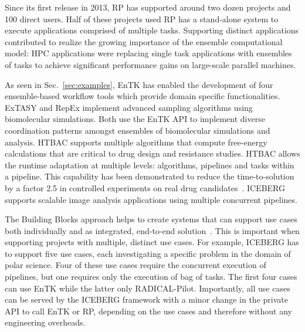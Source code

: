 \documentclass[preprint,12pt, a4paper]{elsarticle}
\begin{document}
Since its first release in 2013, RP has supported around two dozen projects
and 100 direct users. Half of these projects used RP has a stand-alone system
to execute applications comprised of multiple tasks. Supporting distinct
applications contributed to realize the growing importance of the
ensemble computational model: HPC applications were replacing single task
applications with ensembles of tasks to achieve significant performance gains
on large-scale parallel machines.

As seen in Sec.~\ref{sec:examples}, EnTK has enabled the development of four
ensemble-based workflow tools which provide domain specific functionalities.
ExTASY and RepEx implement advanced sampling algorithms using biomolecular
simulations. Both use the EnTK API to implement  diverse coordination patterns
amongst ensembles of biomolecular simulations and analysis. HTBAC supports
multiple algorithms that compute free-energy calculations that are critical to
drug design and resistance studies. HTBAC allows the runtime adaptation at
multiple levels: algorithms, pipelines and tasks within a pipeline. This
capability has been demonstrated to reduce the time-to-solution by a factor 2.5
in controlled experiments on real drug candidates~\citep{dakka2018concurrent}.
ICEBERG~\cite{paraskevakos2019workflow} supports scalable image analysis
applications using multiple concurrent pipelines.

The Building Blocks approach helps to create systems that can support use cases
both individually and as integrated, end-to-end
solution~\cite{turilli2019middleware}. This is important when supporting
projects with multiple, distinct use cases. For example, ICEBERG has to support
five use cases, each investigating a specific problem in the domain of polar
science. Four of these use cases require the concurrent execution of pipelines,
but one requires only the execution of bag of tasks. The first four cases can
use EnTK while the latter only RADICAL-Pilot. Importantly, all use cases can be
served by the ICEBERG framework with a minor change in the private API to call
EnTK or RP, depending on the use cases and therefore without any engineering
overheads.

\end{document}
